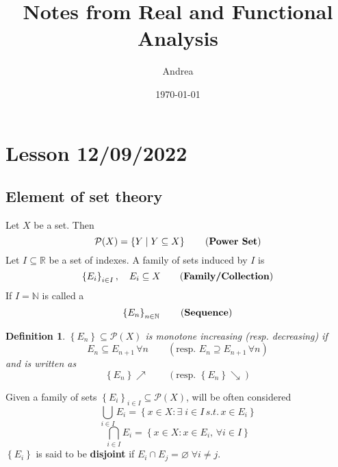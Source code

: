 \documentclass[a4paper,12pt]{article}
\theoremstyle{break}
\newtheorem{definition}{Definition}[section]
\let\emptyset\varnothing
\numberwithin{equation}{section}
\begin{document}
\title{Notes from Real and Functional Analysis}
\author{Andrea }
\date{\today}
\maketitle
\newpage

\section{Lesson 12/09/2022}

\subsection*{Element of set theory}
Let \(X\) be a set. Then 
\[
    \mathcal{P}(X) = \left\lbrace Y \; | \; Y \subseteq X \right\rbrace \tag{\textbf{Power Set}}
\]
Let \(I \subseteq \mathbb{R}\) be a set of indexes. A family of sets induced by \(I\) is 
\[
    \left\lbrace E_i \right\rbrace_{i \in I}, \quad E_i \subseteq X  \tag{\textbf{Family/Collection}}
\]
If \(I = \mathbb{N} \) is called a 
\[
    \left\lbrace E_n \right\rbrace_{n \in \mathbb{N}} \tag{\textbf{Sequence}}
\]
\begin{definition}
    \( \left\lbrace E_n \right\rbrace \subseteq \mathcal{P}(X) \) is monotone increasing (resp. decreasing) if 
    \[
        E_n \subseteq E_{n+1} \,\forall n \qquad (\mbox{resp. } E_n \supseteq E_{n+1} \, \forall n)
    \]
    and is written as 
    \[
        \left\lbrace E_n \right\rbrace \nearrow \qquad (\mbox{resp. }\left\lbrace E_n \right\rbrace \searrow)
    \]
\end{definition}
Given a family of sets \(\left\lbrace E_i \right\rbrace_{i \in I} \subseteq \mathcal{P}(X)\), will be often considered
\[
    \bigcup_{i \in I} E_i = \left\lbrace x \in X : \exists \; i \in I \, s.t. \, x \in E_i \right\rbrace 
\]
\[
    \bigcap_{i \in I} E_i = \left\lbrace x \in X : x \in E_i, \, \forall i \in I \right\rbrace
\]
\(\left\lbrace E_i \right\rbrace\) is said to be \textbf{disjoint} if \(E_i \cap E_j = \emptyset \; \forall i \not = j\).
\end{document}
